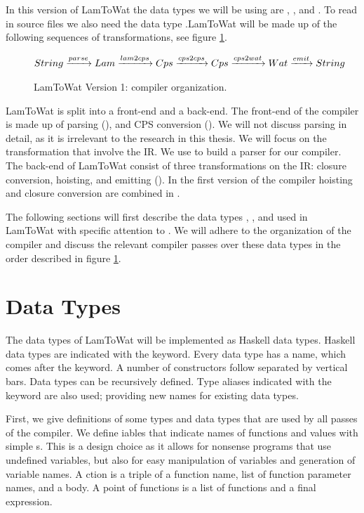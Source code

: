 In this version of LamToWat the data types we will be using are , , and . To read in source files we also need the data type .LamToWat will be made up of the following sequences of transformations, see figure \ref{fig:lam2watv1org}.

\begin{figure}
\begin{gather*}
  String \xrightarrow{parse} Lam \xrightarrow{lam2cps} Cps \xrightarrow{cps2cps} Cps \xrightarrow{cps2wat} Wat \xrightarrow{emit} String
\end{gather*}
\caption{LamToWat Version 1: compiler organization.}
\label{fig:lam2watv1org}
\end{figure}

LamToWat is split into a front-end and a back-end. The front-end of the compiler is made up of parsing (), and CPS conversion (). We will not discuss  parsing in detail, as it is irrelevant to the research in this thesis. We will focus on the transformation that involve the IR. We use  to build a parser for our compiler. The back-end of LamToWat consist of three transformations on the IR: closure conversion, hoisting, and emitting (). In the first version of the compiler hoisting and closure conversion are combined in .

The following sections will first describe the data types , , and  used in LamToWat with specific attention to . We will adhere to the organization of the compiler and discuss the relevant compiler passes over these data types in the order described in figure \ref{fig:lam2watv1org}.

\section{\label{section:datatypes}Data Types}
The data types of LamToWat will be implemented as Haskell data types. Haskell data types are indicated with the  keyword. Every data type has a name, which comes after the keyword. A number of constructors follow separated by vertical bars. Data types can be recursively defined. Type aliases indicated with the  keyword are also used; providing new names for existing data types.

First, we give definitions of some types and data types that are used by all passes of the compiler. We define iables that indicate names of functions and values with simple s. This is a design choice as it allows for nonsense programs that use undefined variables, but also for easy manipulation of variables and generation of variable names. A ction is a triple of a function name, list of function parameter names, and a body. A point of functions is a list of functions and a final expression.

